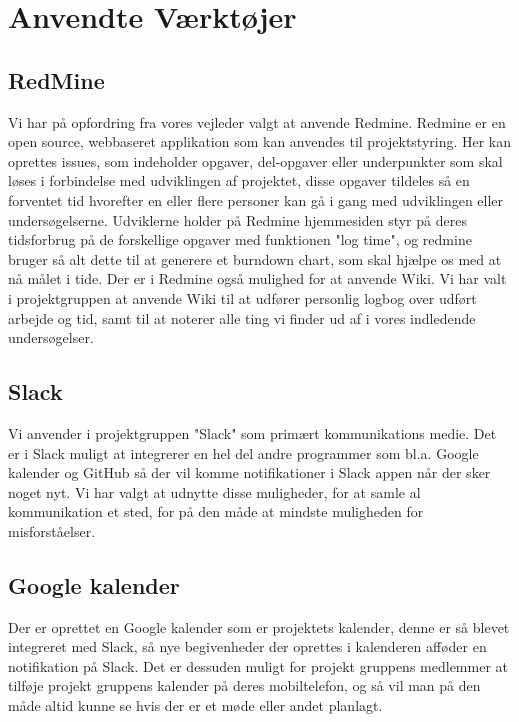 \chapter{Anvendte Værktøjer}
\section{RedMine}
Vi har på opfordring fra vores vejleder valgt at anvende Redmine. 
Redmine er en open source, webbaseret applikation som kan anvendes til projektstyring. Her kan oprettes issues, som indeholder opgaver, del-opgaver eller underpunkter som skal løses i forbindelse med udviklingen af projektet, disse opgaver tildeles så en forventet tid hvorefter en eller flere personer kan gå i gang med udviklingen eller undersøgelserne. Udviklerne holder på Redmine hjemmesiden styr på deres tidsforbrug på de forskellige opgaver med funktionen "log time", og redmine bruger så alt dette til at generere et burndown chart, som skal hjælpe os med at nå målet i tide. Der er i Redmine også mulighed for at anvende Wiki. Vi har valt i projektgruppen at anvende Wiki til at udfører personlig logbog over udført arbejde og tid, samt til at noterer alle ting vi finder ud af i vores indledende undersøgelser.
\section{Slack}
Vi anvender i projektgruppen "Slack" som primært kommunikations medie. Det er i Slack muligt at integrerer en hel del andre programmer som bl.a. Google kalender og GitHub så der vil komme notifikationer i Slack appen når der sker noget nyt. Vi har valgt at udnytte disse muligheder, for at samle al kommunikation et sted, for på den måde at mindste muligheden for misforståelser.
\section{Google kalender}
Der er oprettet en Google kalender som er projektets kalender, denne er så blevet integreret med Slack, så nye begivenheder der oprettes i kalenderen afføder en notifikation på Slack. Det er dessuden muligt for projekt gruppens medlemmer at tilføje projekt gruppens kalender på deres mobiltelefon, og så vil man på den måde altid kunne se hvis der er et møde eller andet planlagt.
